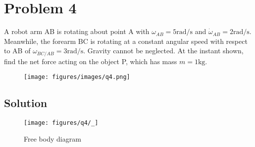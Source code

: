 \section*{Problem 4}

A robot arm AB is rotating about point A with \( \omega_{AB} = 5 \text{rad/s} \) and \( \dot\omega_{AB} = 2 \text{rad/s} \).
Meanwhile, the forearm BC is rotating at a constant angular speed with respect to AB of \( \omega_{BC/AB} = 3 \text{rad/s} \).
Gravity cannot be neglected.
At the instant shown, find the net force acting on the object P, which has mass \( m = 1\text{kg} \).

\begin{figure*}[h]
    \centering
    \texttt{[image: figures/images/q4.png]}
\end{figure*}

\subsection*{Solution}

\begin{figure*}[htb]
    \centering
    \texttt{[image: figures/q4/\_]}
    \caption{
        Free body diagram
    }
\end{figure*}
